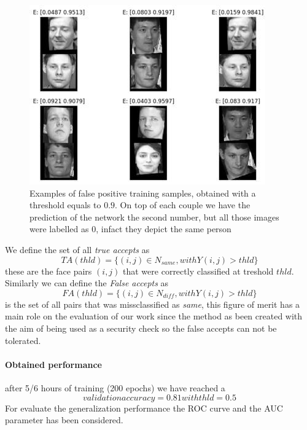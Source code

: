 \begin{figure}[t]
\includegraphics[width=1\linewidth]{images/falsepositive.jpg}
   \caption{Examples of false positive training samples, obtained with a threshold equals to $0.9$. On top of each couple we have the prediction of the network \ie the second number, but all those images were labelled as 0, infact they depict the same person}
\label{fig:long}
\label{fig:onecol}
\end{figure} 
 
We define the set of all \textit{true accepts} as
\begin{equation}
TA(thld)=\{(i,j) \in N_{same}, with Y(i,j) > thld\}
\end{equation}
these are the face pairs $(i,j)$ that were correctly classified at treshold $thld$.
Similarly we can define the \textit{False accepts} as 
\begin{equation}
FA(thld)=\{(i,j) \in N_{diff}, with Y(i,j) > thld\} 
\end{equation}
is the set of all pairs that was missclassified as \textit{same}, this figure of merit has a main role on the evaluation of our work since the method as been created with the aim of being used as a security check so the false accepts can not be tolerated.
\paragraph{Obtained performance}
after 5/6 hours of training (200 epochs) we have reached a
\begin{equation}
validationaccuracy = 0.81 with thld = 0.5
\end{equation}
For evaluate the generalization performance the ROC curve and the AUC parameter has been considered.

